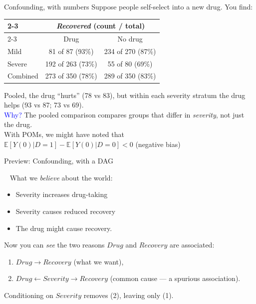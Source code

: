 \documentclass[xcolor=dvipsnames]{beamer}
\newcommand{\la}{\leftarrow}
\newcommand\E{\mathbb{E}}
\begin{document}
\begin{frame}{Confounding, with numbers}
\small
{} Suppose people self-select into a new drug.  You find:
\begin{table}
\footnotesize
\centering
\begin{tabular}{l|c|c|}
\cline{2-3}
 & \multicolumn{2}{c|}{\textit{Recovered} (count / total)} \\ \cline{2-3}
 & Drug & No drug \\ \hline
\multicolumn{1}{|l|}{Mild}     & 81 of 87 (93\%)  & 234 of 270 (87\%) \\ \hline
\multicolumn{1}{|l|}{Severe}   & 192 of 263 (73\%) & 55 of 80 (69\%) \\ \hline
\multicolumn{1}{|l|}{Combined} & 273 of 350 (78\%) & 289 of 350 (83\%) \\ \hline
\end{tabular}
\end{table}

 Pooled, the drug ``hurts'' (78 vs 83), but within each severity stratum the drug helps (93 vs 87; 73 vs 69).\\
\bigskip
{} \textcolor{Blue}{Why?} The pooled comparison compares groups that differ in \textit{severity}, not just the drug.\\
\bigskip
{} With POMs, we might have noted that $\E[Y(0)|D=1]-\E[Y(0)|D=0] < 0$ (negative bias)\\
\end{frame}


\begin{frame}{Preview: Confounding, with a DAG}

\
\medskip
\onslide<1-> What we \textit{believe} about the world:
\begin{itemize}
\footnotesize
\item Severity increases drug-taking
\item Severity causes reduced recovery
\item The drug might cause recovery.
\end{itemize}

\begin{center}
\end{center}

 Now you can \textit{see} the two reasons $Drug$ and $Recovery$ are associated:
\begin{enumerate}
\footnotesize
\item $Drug \to Recovery$ (what we want),
\item $Drug \la Severity \to Recovery$ (common cause --- a spurious association).
\end{enumerate}

\onslide<4-> Conditioning on $Severity$ removes (2), leaving only (1).
\end{frame}
\end{document}
